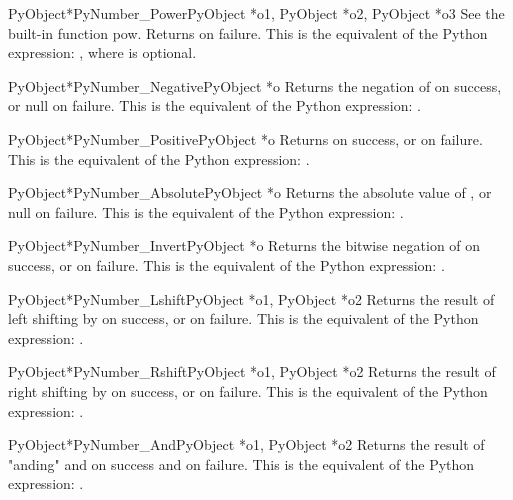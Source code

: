      \begin{cfuncdesc}{PyObject*}{PyNumber_Power}{PyObject *o1, PyObject *o2, PyObject *o3}
	 See the built-in function pow.  Returns {\NULL} on failure.
	 This is the equivalent of the Python expression:
	 , where  is optional.
     \end{cfuncdesc}


     \begin{cfuncdesc}{PyObject*}{PyNumber_Negative}{PyObject *o}
	 Returns the negation of  on success, or null on failure.
	 This is the equivalent of the Python expression: .
     \end{cfuncdesc}


     \begin{cfuncdesc}{PyObject*}{PyNumber_Positive}{PyObject *o}
         Returns  on success, or {\NULL} on failure.
	 This is the equivalent of the Python expression: .
     \end{cfuncdesc}


     \begin{cfuncdesc}{PyObject*}{PyNumber_Absolute}{PyObject *o}
	 Returns the absolute value of , or null on failure.  This is
	 the equivalent of the Python expression: .
     \end{cfuncdesc}


     \begin{cfuncdesc}{PyObject*}{PyNumber_Invert}{PyObject *o}
	 Returns the bitwise negation of  on success, or {\NULL} on
	 failure.  This is the equivalent of the Python expression:
	 .
     \end{cfuncdesc}


     \begin{cfuncdesc}{PyObject*}{PyNumber_Lshift}{PyObject *o1, PyObject *o2}
	 Returns the result of left shifting  by  on success, or
	 {\NULL} on failure.  This is the equivalent of the Python
	 expression: .
     \end{cfuncdesc}


     \begin{cfuncdesc}{PyObject*}{PyNumber_Rshift}{PyObject *o1, PyObject *o2}
	 Returns the result of right shifting  by  on success, or
	 {\NULL} on failure.  This is the equivalent of the Python
	 expression: .
     \end{cfuncdesc}


     \begin{cfuncdesc}{PyObject*}{PyNumber_And}{PyObject *o1, PyObject *o2}
	 Returns the result of "anding"  and  on success and {\NULL}
	 on failure. This is the equivalent of the Python
	 expression: .
     \end{cfuncdesc}


